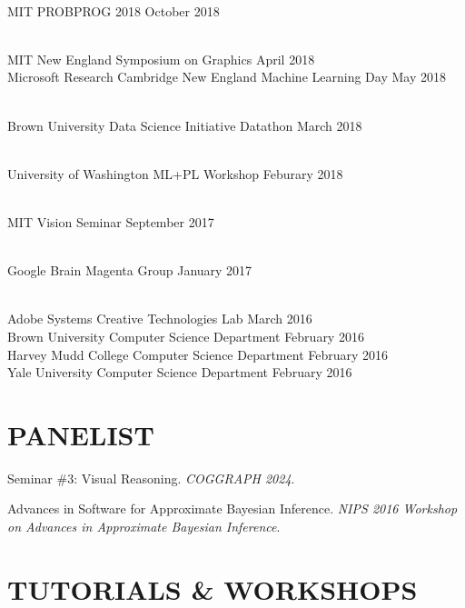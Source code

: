 \documentclass[line,margin]{res}
\begin{document}
\begin{resume}
\\
\talk
	{MIT}
	{PROBPROG 2018}
	{October 2018}

\\
\talk
	{MIT}
	{New England Symposium on Graphics}
	{April 2018}\\
\talk
	{Microsoft Research Cambridge}
	{New England Machine Learning Day}
	{May 2018}

\\
\talk
	{Brown University Data Science Initiative}
	{Datathon}
	{March 2018}

\\
\talk
	{University of Washington}
	{ML+PL Workshop}
	{Feburary 2018}

\\
\talk
	{MIT}
	{Vision Seminar}
	{September 2017}

\\
\talk
	{Google Brain}
	{Magenta Group}
	{January 2017}

\\
\talk
	{Adobe Systems}
	{Creative Technologies Lab}
	{March 2016}\\
\talk
	{Brown University}
	{Computer Science Department}
	{February 2016}\\
\talk
	{Harvey Mudd College}
	{Computer Science Department}
	{February 2016}\\
\talk
	{Yale University}
	{Computer Science Department}
	{February 2016}


\section{PANELIST}

\newcommand{\panelist}[2]{
	#1. \emph{#2}.
}

\panelist{Seminar \#3: Visual Reasoning}{COGGRAPH 2024}

\panelist{Advances in Software for Approximate Bayesian Inference}{NIPS 2016 Workshop on Advances in Approximate Bayesian Inference}


\section{TUTORIALS \& WORKSHOPS}


\end{resume}
\end{document}
